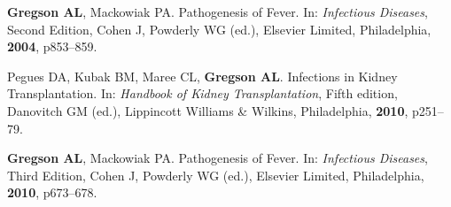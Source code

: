 \documentclass[letterpaper,11pt,sans,final]{/usr/local/share/texmf-dist/tex/latex/moderncv/moderncv}%
\begin{document}
\closesection{}
\vspace{0.2cm}
\renewcommand{\refname}{Publications--Chapters}
\begin{thebibliography}{1}
 \bibitem[1]{} \textbf{Gregson AL}, Mackowiak PA. Pathogenesis of Fever. In: {\color{BrickRed}\textit{Infectious Diseases}}, Second Edition, Cohen J, Powderly WG (ed.), Elsevier Limited, Philadelphia, \textbf{2004}, p853--859.

 \bibitem[2]{} Pegues DA, Kubak BM, Maree CL, \textbf{Gregson AL}. Infections in Kidney Transplantation. In: {\color{BrickRed}\textit{Handbook of Kidney Transplantation}}, Fifth edition, Danovitch GM (ed.), Lippincott Williams \& Wilkins, Philadelphia, \textbf{2010}, p251--79. 

 \bibitem[3]{} \textbf{Gregson AL}, Mackowiak PA. Pathogenesis of Fever. In: {\color{BrickRed}\textit{Infectious Diseases}}, Third Edition, Cohen J, Powderly WG (ed.), Elsevier Limited, Philadelphia, \textbf{2010}, p673--678.

\end{thebibliography} 

\end{document}
